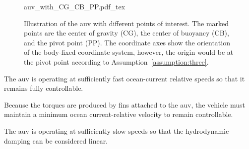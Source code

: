 \begin{figure}[ht]
    \centering
    \def\svgwidth{.5\textwidth}
    {auv_with_CG_CB_PP.pdf_tex}
    \caption{Illustration of the \gls{auv} with different points of interest. The marked points are the center of gravity (CG), the center of buoyancy (CB), and the pivot point (PP). The coordinate axes show the orientation of the body-fixed coordinate system, however, the origin would be at the pivot point according to Assumption~\ref{assumption:three}.}
    \label{fig:auv_model}
\end{figure}

\begin{assumption}
    The \gls{auv} is operating at sufficiently fast ocean-current relative speeds so that it remains fully controllable.
\end{assumption}
Because the torques are produced by fins attached to the \gls{auv}, the vehicle must maintain a minimum ocean current-relative velocity to remain controllable.

\begin{assumption}\label{assumption:four}
The \gls{auv} is operating at sufficiently slow speeds so that the hydrodynamic damping can be considered linear.
\end{assumption}


